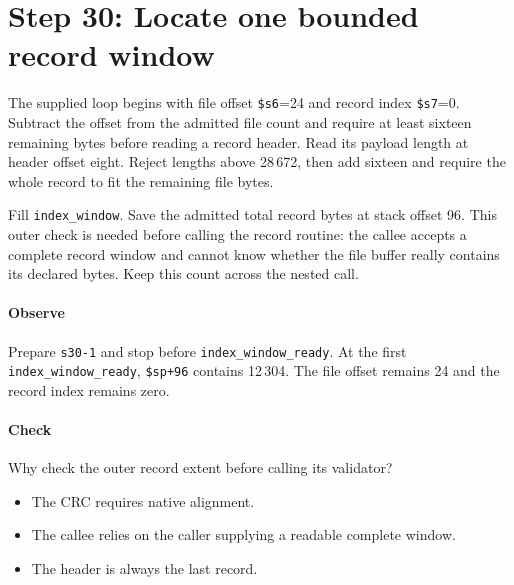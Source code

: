 \section{Step 30: Locate one bounded record window}
The supplied loop begins with file offset \texttt{\$s6}=24 and record
index \texttt{\$s7}=0. Subtract the offset from the admitted file count and
require at least sixteen remaining bytes before reading a record header. Read
its payload length at header offset eight. Reject lengths above 28\,672, then
add sixteen and require the whole record to fit the remaining file bytes.

Fill \texttt{index\_window}. Save the admitted total record bytes at stack
offset 96. This outer check is needed before calling the record routine: the
callee accepts a complete record window and cannot know whether the file buffer
really contains its declared bytes. Keep this count across the nested call.

\paragraph{Observe} Prepare \texttt{s30-1} and stop before
\texttt{index\_window\_ready}. At the first \texttt{index\_window\_ready},
\texttt{\$sp+96} contains 12\,304. The file offset remains 24 and the record
index remains zero.

\paragraph{Check} Why check the outer record extent before calling its validator?
\begin{itemize}
  \item[A.] The CRC requires native alignment.
  \item[B.] The callee relies on the caller supplying a readable complete window.
  \item[C.] The header is always the last record.
\end{itemize}
